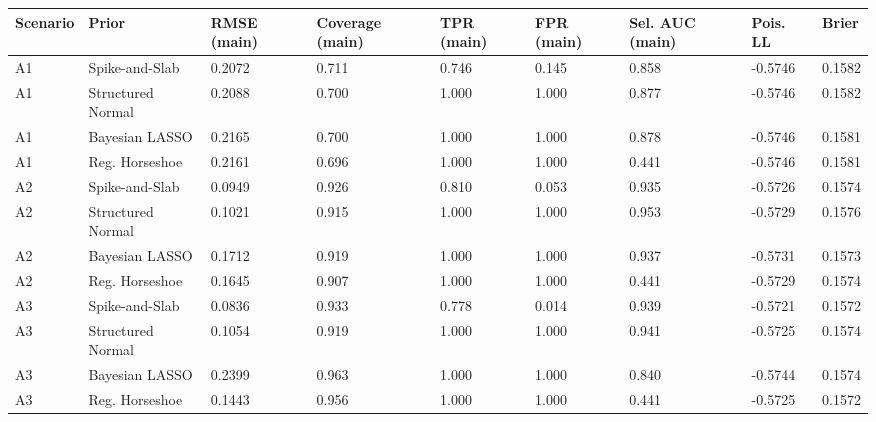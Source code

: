 \begin{tabular}{lllllllll}
  \hline
Scenario & Prior & RMSE (main) & Coverage (main) & TPR (main) & FPR (main) & Sel. AUC (main) & Pois. LL & Brier \\ 
  \hline
A1 & Spike-and-Slab & 0.2072 & 0.711 & 0.746 & 0.145 & 0.858 & -0.5746 & 0.1582 \\ 
  A1 & Structured Normal & 0.2088 & 0.700 & 1.000 & 1.000 & 0.877 & -0.5746 & 0.1582 \\ 
  A1 & Bayesian LASSO & 0.2165 & 0.700 & 1.000 & 1.000 & 0.878 & -0.5746 & 0.1581 \\ 
  A1 & Reg. Horseshoe & 0.2161 & 0.696 & 1.000 & 1.000 & 0.441 & -0.5746 & 0.1581 \\ 
  A2 & Spike-and-Slab & 0.0949 & 0.926 & 0.810 & 0.053 & 0.935 & -0.5726 & 0.1574 \\ 
  A2 & Structured Normal & 0.1021 & 0.915 & 1.000 & 1.000 & 0.953 & -0.5729 & 0.1576 \\ 
  A2 & Bayesian LASSO & 0.1712 & 0.919 & 1.000 & 1.000 & 0.937 & -0.5731 & 0.1573 \\ 
  A2 & Reg. Horseshoe & 0.1645 & 0.907 & 1.000 & 1.000 & 0.441 & -0.5729 & 0.1574 \\ 
  A3 & Spike-and-Slab & 0.0836 & 0.933 & 0.778 & 0.014 & 0.939 & -0.5721 & 0.1572 \\ 
  A3 & Structured Normal & 0.1054 & 0.919 & 1.000 & 1.000 & 0.941 & -0.5725 & 0.1574 \\ 
  A3 & Bayesian LASSO & 0.2399 & 0.963 & 1.000 & 1.000 & 0.840 & -0.5744 & 0.1574 \\ 
  A3 & Reg. Horseshoe & 0.1443 & 0.956 & 1.000 & 1.000 & 0.441 & -0.5725 & 0.1572 \\ 
   \hline
\end{tabular}
